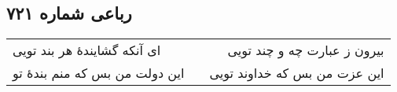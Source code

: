 \begin{center}
\section*{رباعی شماره ۷۲۱}
\label{sec:sh721}
\begin{longtable}{l p{0.5cm} r}
ای آنکه گشایندهٔ هر بند تویی
&&
بیرون ز عبارت چه و چند تویی
\\
این دولت من بس که منم بندهٔ تو
&&
این عزت من بس که خداوند تویی
\\
\end{longtable}
\end{center}
